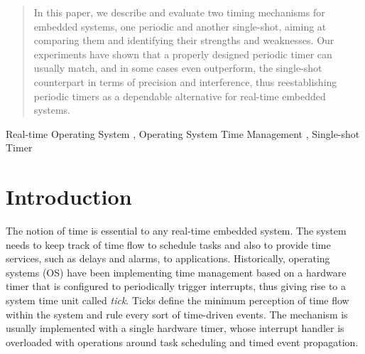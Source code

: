 \documentclass[final,3pd,times]{elsarticle}
\begin{document}
\begin{frontmatter}
\begin{abstract}
  In this paper, we describe and evaluate two timing mechanisms for
  embedded systems, one periodic and another single-shot, aiming at
  comparing them and identifying their strengths and weaknesses.  Our
  experiments have shown that a properly designed periodic timer can
  usually match, and in some cases even outperform, the single-shot
  counterpart in terms of precision and interference, thus
  reestablishing periodic timers as a dependable alternative for
  real-time embedded systems.
\end{abstract}

\begin{keyword}

Real-time Operating System \sep
Operating System Time Management \sep
Single-shot Timer
\end{keyword}

\end{frontmatter}


\section{Introduction} \label{sec:intro}

The notion of time is essential to any real-time embedded system. The
system needs to keep track of time flow to schedule tasks and also to
provide time services, such as delays and alarms, to applications.
Historically, operating systems (OS) have been implementing time
management based on a hardware timer that is configured to periodically
trigger interrupts, thus giving rise to a system time unit called
\emph{tick}. Ticks define the minimum perception of time flow within the
system and rule every sort of time-driven events. The mechanism is
usually implemented with a single hardware timer, whose interrupt
handler is overloaded with operations around task scheduling and timed
event propagation.
\end{document}
